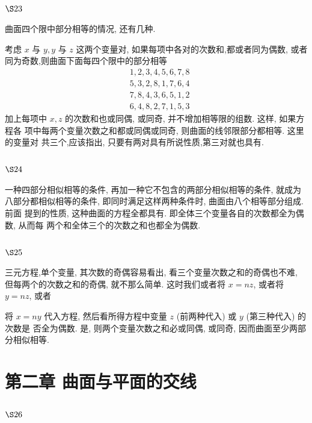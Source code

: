 \section{$\S 23$}

曲面四个限中部分相等的情况, 还有几种.

考虑 $x$ 与 $y, y$ 与 $z$ 这两个变量对, 如果每项中各对的次数和,都或者同为偶数, 或者 同为奇数,则曲面下面每四个限中的部分相等
\[
\begin{aligned}
& 1,2,3,4,5,6,7,8 \\
& 5,3,2,8,1,7,6,4 \\
& 7,8,4,3,6,5,1,2 \\
& 6,4,8,2,7,1,5,3
\end{aligned}
\]
加上每项中 $x, z$ 的次数和也或同偶, 或同奇, 并不增加相等限的组数. 这样, 如果方程各 项中每两个变量次数之和都或同偶或同奇, 则曲面的线邻限部分都相等. 这里的变量对 共三个,应该指出, 只要有两对具有所说性质,第三对就也具有.

\section{$\S 24$}

一种四部分相似相等的条件, 再加一种它不包含的两部分相似相等的条件, 就成为 八部分都相似相等的条件, 即同时满足这样两种条件时, 曲面由八个相等部分组成. 前面 提到的性质, 这种曲面的方程全都具有. 即全体三个变量各自的次数都全为偶数, 从而每 两个和全体三个的次数之和也都全为偶数.

\section{$\S 25$}

三元方程,单个变量, 其次数的奇偶容易看出, 看三个变量次数之和的奇偶也不难, 但每两个的次数之和的奇偶, 就不那么简单. 这时我们或者将 $x=n z$, 或者将 $y=n z$, 或者

将 $x=n y$ 代入方程, 然后看所得方程中变量 $z$ (前两种代入) 或 $y$ (第三种代入) 的次数是 否全为偶数. 是, 则两个变量次数之和必或同偶, 或同奇, 因而曲面至少两部分相似相等. 

\chapter{第二章 曲面与平面的交线}

\section{$\S 26$}

